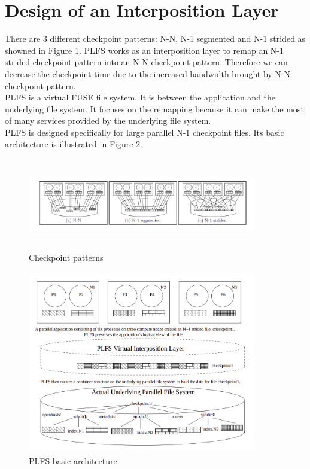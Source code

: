 \documentclass[conference]{IEEEtran}
\begin{document}
\section{Design of an Interposition Layer}

There are 3 different checkpoint patterns: N-N, N-1 segmented and N-1 strided as showned in Figure 1. PLFS works as an interposition layer to remap an N-1 strided checkpoint pattern into an N-N checkpoint pattern. Therefore we can decrease the checkpoint time due to the increased bandwidth brought by N-N checkpoint pattern.
\\PLFS is a virtual FUSE file system. It is between the application and the underlying file system. It focuses on the remapping because it can make the most of many services provided by the underlying file system.
\\PLFS is designed specifically for large parallel N-1 checkpoint files. Its basic architecture is illustrated in Figure 2.

\begin{figure}[htbp]
	\centering
	\includegraphics[width=10cm,height=4cm]{pattern.png}
	\caption{Checkpoint patterns}
\end{figure}

\begin{figure}[htbp]
	\centering
	\includegraphics[width=10cm,height=8cm]{architecture.png}
	\caption{PLFS basic architecture}
\end{figure}
\end{document}
